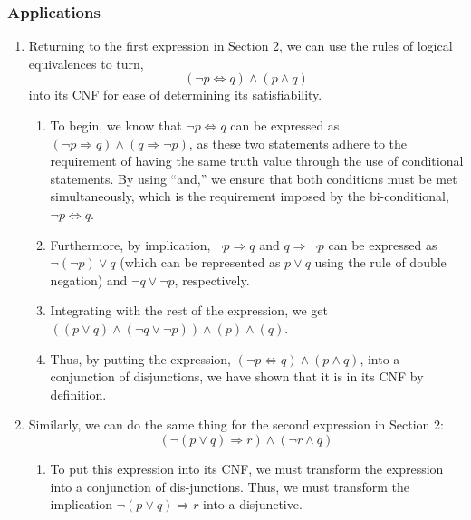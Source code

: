 \documentclass{article}
\begin{document}
            \subsubsection{Applications}

            \begin{enumerate}
                
            \item Returning to the first expression in Section 2, we can use the rules of logical equivalences to turn, $$(\neg p \iff q) \land (p \land q)$$ into its CNF for ease of determining its satisfiability.

            \begin{enumerate}
                \item To begin, we know that $\neg p \iff q$ can be expressed as $(\neg p \Rightarrow q) \land (q\Rightarrow \neg p)$, as these two statements adhere to the requirement of having the same truth value through the use of conditional statements. By using ``and,'' we ensure that both conditions must be met simultaneously, which is the requirement imposed by the bi-conditional, $\neg p \iff q$.
            
                \item Furthermore, by implication, $\neg p\Rightarrow q$ and $q\Rightarrow \neg p$ can be expressed as $\neg(\neg p) \lor q$ (which can be represented as $p\lor q$ using the rule of double negation) and $\neg q \lor \neg p$, respectively.
            
                \item Integrating with the rest of the expression, we get $((p \lor q) \land (\neg q \lor \neg p)) \land (p) \land (q)$.
            
                \item Thus, by putting the expression, $(\neg p \iff q) \land (p \land q)$, into a conjunction of disjunctions, we have shown that it is in its CNF by definition.

            \end{enumerate}

\newpage
            
            \item Similarly, we can do the same thing for the second expression in Section 2: $$(\neg(p\lor q) \Rightarrow r) \land (\neg r \land q)$$

            \begin{enumerate}
                \item To put this expression into its CNF, we must transform the expression into a conjunction of dis-junctions. Thus, we must transform the implication $\neg(p \lor q) \Rightarrow r$ into a disjunctive. \\
                

\end{enumerate}
\end{enumerate}
\end{document}
